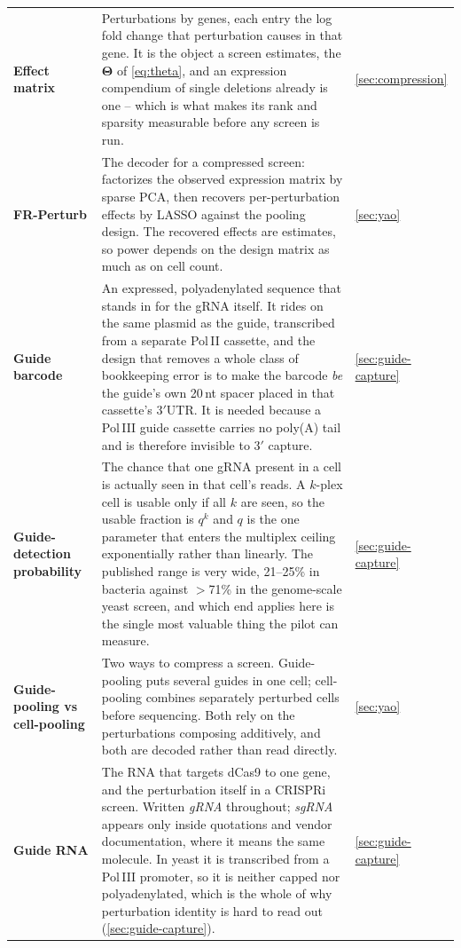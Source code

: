 \begin{longtable}{@{}>{\raggedright\arraybackslash}p{}>{\raggedright\arraybackslash}p{}>{\raggedright\arraybackslash}p{}@{}}
\addlinespace[5pt]
\textbf{Effect matrix} & Perturbations by genes, each entry the log fold change that perturbation causes in that gene. It is the object a screen estimates, the $\boldsymbol{\Theta}$ of \cref{eq:theta}, and an expression compendium of single deletions already is one -- which is what makes its rank and sparsity measurable before any screen is run. & \cref{sec:compression} \\
\addlinespace[5pt]
\textbf{FR-Perturb} & The decoder for a compressed screen: factorizes the observed expression matrix by sparse PCA, then recovers per-perturbation effects by LASSO against the pooling design. The recovered effects are estimates, so power depends on the design matrix as much as on cell count. & \cref{sec:yao} \\
\addlinespace[5pt]
\textbf{Guide barcode}\newline {\color{tcgray}(GBC)} & An expressed, polyadenylated sequence that stands in for the gRNA itself. It rides on the same plasmid as the guide, transcribed from a separate Pol\,II cassette, and the design that removes a whole class of bookkeeping error is to make the barcode \emph{be} the guide's own 20\,nt spacer placed in that cassette's 3$'$UTR. It is needed because a Pol\,III guide cassette carries no poly(A) tail and is therefore invisible to 3$'$ capture. & \cref{sec:guide-capture} \\
\addlinespace[5pt]
\textbf{Guide-detection probability}\newline {\color{tcgray}($q$)} & The chance that one gRNA present in a cell is actually seen in that cell's reads. A $k$-plex cell is usable only if all $k$ are seen, so the usable fraction is $q^{k}$ and $q$ is the one parameter that enters the multiplex ceiling exponentially rather than linearly. The published range is very wide, 21--25\% in bacteria against $>$71\% in the genome-scale yeast screen, and which end applies here is the single most valuable thing the pilot can measure.~\citep{nadal-ribellesSinglecellResolvedGenotypephenotype2025} & \cref{sec:guide-capture} \\
\addlinespace[5pt]
\textbf{Guide-pooling vs cell-pooling} & Two ways to compress a screen. Guide-pooling puts several guides in one cell; cell-pooling combines separately perturbed cells before sequencing. Both rely on the perturbations composing additively, and both are decoded rather than read directly. & \cref{sec:yao} \\
\addlinespace[5pt]
\textbf{Guide RNA}\newline {\color{tcgray}(gRNA)} & The RNA that targets dCas9 to one gene, and the perturbation itself in a CRISPRi screen. Written \emph{gRNA} throughout; \emph{sgRNA} appears only inside quotations and vendor documentation, where it means the same molecule. In yeast it is transcribed from a Pol\,III promoter, so it is neither capped nor polyadenylated, which is the whole of why perturbation identity is hard to read out (\cref{sec:guide-capture}). & \cref{sec:guide-capture} \\

\end{longtable}
